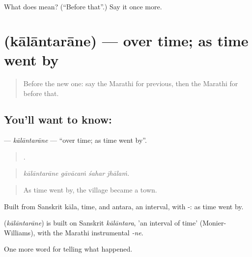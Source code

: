 \begin{tcolorbox}[breakable,colback=teal!4,colframe=teal!35!black,title={Before you move on}]
What does  mean? (\textquotedblleft{}Before that\textquotedblright{}.) Say it once more.
\end{tcolorbox}
\section[\texorpdfstring{\mr{कालांतराने} (kālāntarāne)}{कालांतराने (kālāntarāne)}]{ (kālāntarāne) — over time; as time went by}

\label{lesson:MR-C305-kalantarane}



\begin{quote}
Before the new one: say the Marathi for previous, then the Marathi for before that.
\end{quote}

\subsection*{You'll want to know: }
\textbf{} — \emph{kālāntarāne} — \textquotedblleft{}over time; as time went by\textquotedblright{}.

\begin{quote}
   .
\end{quote}

\begin{quote}
\emph{kālāntarāne gāvācaṁ śahar jhālaṁ.}
\end{quote}

\begin{quote}
As time went by, the village became a town.
\end{quote}

Built from Sanskrit kāla, time, and antara, an interval, with -: as time went by.

\begin{cousinweb}
\textbf{} (\emph{kālāntarāne}) is built on Sanskrit \emph{kālāntara}, 'an interval of time' (Monier-Williams), with the Marathi instrumental \emph{-ne}.
\end{cousinweb}

\begin{grammarlens}[title={What you've built}]
One more word for telling what happened.
\end{grammarlens}

